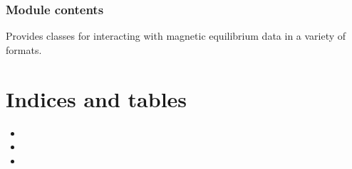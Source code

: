 \documentclass[letterpaper,10pt,english]{sphinxmanual}
\begin{document}
\subsection{Module contents}
\label{\detokenize{eqtools:module-eqtools}}\label{\detokenize{eqtools:module-contents}}
Provides classes for interacting with magnetic equilibrium data in a variety of formats.


\chapter{Indices and tables}
\label{\detokenize{index:indices-and-tables}}\begin{itemize}
\item {} 

\item {} 

\item {} 

\end{itemize}
\end{document}
